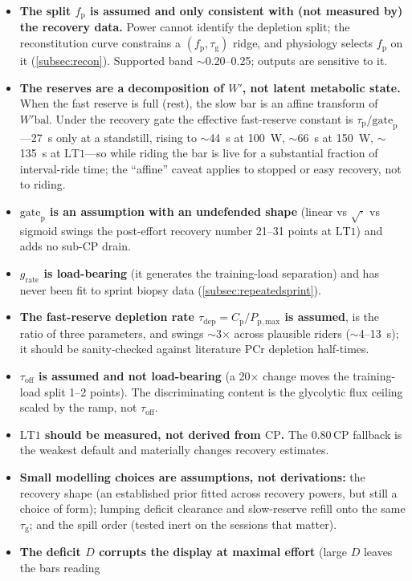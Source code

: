\documentclass[11pt,a4paper]{article}
\newcommand{\Wp}{\ensuremath{W'}}
\newcommand{\Wbal}{\ensuremath{W'\!\text{bal}}}
\newcommand{\CP}{\ensuremath{\mathrm{CP}}}
\newcommand{\LTone}{\ensuremath{\mathrm{LT1}}}
\newcommand{\fp}{\ensuremath{f_{\mathrm p}}}
\newcommand{\Cp}{\ensuremath{C_{\mathrm p}}}
\newcommand{\Ppmax}{\ensuremath{P_{\mathrm{p,max}}}}
\newcommand{\grate}{\ensuremath{g_{\mathrm{rate}}}}
\newcommand{\taup}{\ensuremath{\tau_{\mathrm p}}}
\newcommand{\taug}{\ensuremath{\tau_{\mathrm g}}}
\newcommand{\tauoff}{\ensuremath{\tau_{\mathrm{off}}}}
\newcommand{\taudep}{\ensuremath{\tau_{\mathrm{dep}}}}
\newcommand{\gatep}{\ensuremath{\mathrm{gate}_{\mathrm p}}}
\begin{document}
\begin{itemize}[leftmargin=1.4em,itemsep=3pt]
\item \textbf{The split \fp{} is assumed and only consistent with (not measured by) the recovery data.}
Power cannot identify the depletion split; the reconstitution curve constrains a $(\fp,\taug)$ ridge, and
physiology selects \fp{} on it (\cref{subsec:recon}). Supported band $\sim$0.20--0.25; outputs are
sensitive to it.
\item \textbf{The reserves are a decomposition of \Wp, not latent metabolic state.} When the fast reserve
is full (rest), the slow bar is an affine transform of \Wbal. Under the recovery gate the effective
fast-reserve constant is $\taup/\gatep$---27~s only at a standstill, rising to $\sim$44~s at 100~W,
$\sim$66~s at 150~W, $\sim$135~s at \LTone---so while riding the bar is live for a substantial fraction of
interval-ride time; the ``affine'' caveat applies to stopped or easy recovery, not to riding.
\item \textbf{\gatep{} is an assumption with an undefended shape} (linear vs $\sqrt{\cdot}$ vs sigmoid
swings the post-effort recovery number 21--31 points at \LTone) and adds no sub-\CP{} drain.
\item \textbf{\grate{} is load-bearing} (it generates the training-load separation) and has never been fit
to sprint biopsy data (\cref{subsec:repeatedsprint}).
\item \textbf{The fast-reserve depletion rate $\taudep = \Cp/\Ppmax$ is assumed}, is the ratio of three
parameters, and swings $\sim$3$\times$ across plausible riders ($\sim$4--13~s); it should be sanity-checked
against literature PCr depletion half-times.
\item \textbf{\tauoff{} is assumed and not load-bearing} (a 20$\times$ change moves the training-load split
1--2 points). The discriminating content is the glycolytic flux ceiling scaled by the ramp, not \tauoff.
\item \textbf{\LTone{} should be measured, not derived from \CP.} The $0.80\,\CP$ fallback is the weakest
default and materially changes recovery estimates.
\item \textbf{Small modelling choices are assumptions, not derivations:} the recovery shape (an
established prior fitted across recovery powers, but still a choice of form); lumping deficit clearance and
slow-reserve refill onto the same \taug; and the spill order (tested inert on the sessions that matter).
\item \textbf{The deficit $D$ corrupts the display at maximal effort} (large $D$ leaves the bars reading

\end{itemize}
\end{document}
